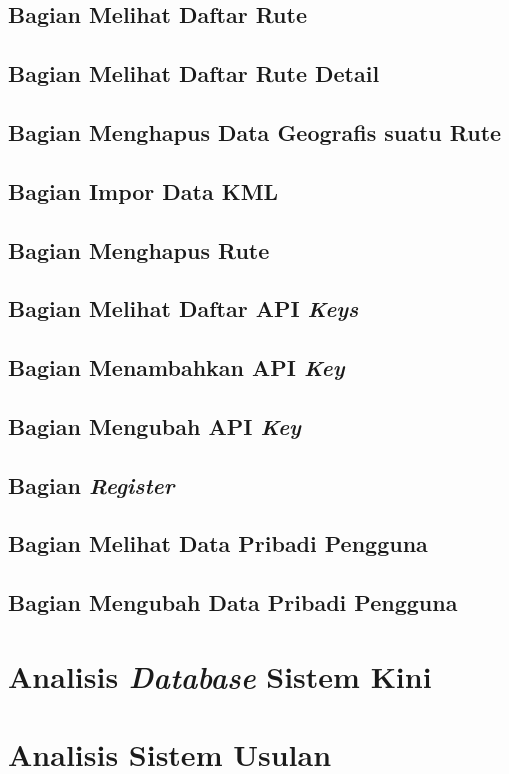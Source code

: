 \subsection{Bagian Melihat Daftar Rute}
\label{sec:melihatdaftarrute}

\subsection{Bagian Melihat Daftar Rute Detail}
\label{sec:melihatdaftarrutedetail}

\subsection{Bagian Menghapus Data Geografis suatu Rute}
\label{sec:hapusgeografis}

\subsection{Bagian Impor Data KML}
\label{sec:imporkml}

\subsection{Bagian Menghapus Rute}
\label{sec:hapusrute}

\subsection{Bagian Melihat Daftar API \textit{Keys}}
\label{sec:lihatapikeys}

\subsection{Bagian Menambahkan API \textit{Key}}
\label{sec:tambahapikey}

\subsection{Bagian Mengubah API \textit{Key}}
\label{sec:ubahapikey}

\subsection{Bagian \textit{Register}}
\label{sec:bagianregister}

\subsection{Bagian Melihat Data Pribadi Pengguna}
\label{sec:lihatdatadiri}

\subsection{Bagian Mengubah Data Pribadi Pengguna}
\label{sec:ubahdatadiri}






\section{Analisis \textit{Database} Sistem Kini}
\label{sec:analisisdatabasesistemkini}


\section{Analisis Sistem Usulan}
\label{sec:analisissistemusulan}
